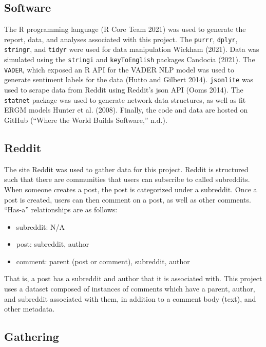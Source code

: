 \documentclass[
]{article}
\providecommand{\tightlist}{%
  \setlength{\itemsep}{0pt}\setlength{\parskip}{0pt}}
\begin{document}
\hypertarget{software}{%
\subsection{Software}\label{software}}

The R programming language (R Core Team 2021) was used to generate the report, data, and analyses associated with this project. The \texttt{purrr}, \texttt{dplyr}, \texttt{stringr}, and \texttt{tidyr} were used for data manipulation Wickham (2021). Data was simulated using the \texttt{stringi} and \texttt{keyToEnglish} packages Candocia (2021). The \texttt{VADER}, which exposed an R API for the VADER NLP model was used to generate sentiment labels for the data (Hutto and Gilbert 2014). \texttt{jsonlite} was used to scrape data from Reddit using Reddit's json API (Ooms 2014). The \texttt{statnet} package was used to generate network data structures, as well as fit ERGM models Hunter et al. (2008). Finally, the code and data are hosted on GitHub ({``Where the World Builds Software,''} n.d.).

\hypertarget{reddit}{%
\subsection{Reddit}\label{reddit}}

The site Reddit was used to gather data for this project. Reddit is structured such that there are communities that users can subscribe to called subreddits. When someone creates a post, the post is categorized under a subreddit. Once a post is created, users can then comment on a post, as well as other comments. ``Has-a'' relationships are as follows:

\begin{itemize}
\tightlist
\item
  subreddit: N/A
\item
  post: subreddit, author
\item
  comment: parent (post or comment), subreddit, author
\end{itemize}

That is, a post has a subreddit and author that it is associated with. This project uses a dataset composed of instances of comments which have a parent, author, and subreddit associated with them, in addition to a comment body (text), and other metadata.

\hypertarget{gathering}{%
\subsection{Gathering}\label{gathering}}
\end{document}

